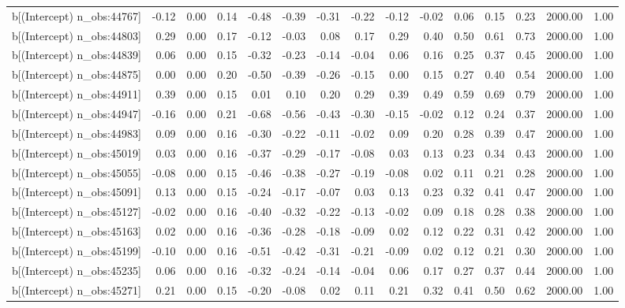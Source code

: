 \begin{table}[ht]
\begin{tabular}{rrrrrrrrrrrrrrr}
  b[(Intercept) n\_obs:44767] & -0.12 & 0.00 & 0.14 & -0.48 & -0.39 & -0.31 & -0.22 & -0.12 & -0.02 & 0.06 & 0.15 & 0.23 & 2000.00 & 1.00 \\ 
  b[(Intercept) n\_obs:44803] & 0.29 & 0.00 & 0.17 & -0.12 & -0.03 & 0.08 & 0.17 & 0.29 & 0.40 & 0.50 & 0.61 & 0.73 & 2000.00 & 1.00 \\ 
  b[(Intercept) n\_obs:44839] & 0.06 & 0.00 & 0.15 & -0.32 & -0.23 & -0.14 & -0.04 & 0.06 & 0.16 & 0.25 & 0.37 & 0.45 & 2000.00 & 1.00 \\ 
  b[(Intercept) n\_obs:44875] & 0.00 & 0.00 & 0.20 & -0.50 & -0.39 & -0.26 & -0.15 & 0.00 & 0.15 & 0.27 & 0.40 & 0.54 & 2000.00 & 1.00 \\ 
  b[(Intercept) n\_obs:44911] & 0.39 & 0.00 & 0.15 & 0.01 & 0.10 & 0.20 & 0.29 & 0.39 & 0.49 & 0.59 & 0.69 & 0.79 & 2000.00 & 1.00 \\ 
  b[(Intercept) n\_obs:44947] & -0.16 & 0.00 & 0.21 & -0.68 & -0.56 & -0.43 & -0.30 & -0.15 & -0.02 & 0.12 & 0.24 & 0.37 & 2000.00 & 1.00 \\ 
  b[(Intercept) n\_obs:44983] & 0.09 & 0.00 & 0.16 & -0.30 & -0.22 & -0.11 & -0.02 & 0.09 & 0.20 & 0.28 & 0.39 & 0.47 & 2000.00 & 1.00 \\ 
  b[(Intercept) n\_obs:45019] & 0.03 & 0.00 & 0.16 & -0.37 & -0.29 & -0.17 & -0.08 & 0.03 & 0.13 & 0.23 & 0.34 & 0.43 & 2000.00 & 1.00 \\ 
  b[(Intercept) n\_obs:45055] & -0.08 & 0.00 & 0.15 & -0.46 & -0.38 & -0.27 & -0.19 & -0.08 & 0.02 & 0.11 & 0.21 & 0.28 & 2000.00 & 1.00 \\ 
  b[(Intercept) n\_obs:45091] & 0.13 & 0.00 & 0.15 & -0.24 & -0.17 & -0.07 & 0.03 & 0.13 & 0.23 & 0.32 & 0.41 & 0.47 & 2000.00 & 1.00 \\ 
  b[(Intercept) n\_obs:45127] & -0.02 & 0.00 & 0.16 & -0.40 & -0.32 & -0.22 & -0.13 & -0.02 & 0.09 & 0.18 & 0.28 & 0.38 & 2000.00 & 1.00 \\ 
  b[(Intercept) n\_obs:45163] & 0.02 & 0.00 & 0.16 & -0.36 & -0.28 & -0.18 & -0.09 & 0.02 & 0.12 & 0.22 & 0.31 & 0.42 & 2000.00 & 1.00 \\ 
  b[(Intercept) n\_obs:45199] & -0.10 & 0.00 & 0.16 & -0.51 & -0.42 & -0.31 & -0.21 & -0.09 & 0.02 & 0.12 & 0.21 & 0.30 & 2000.00 & 1.00 \\ 
  b[(Intercept) n\_obs:45235] & 0.06 & 0.00 & 0.16 & -0.32 & -0.24 & -0.14 & -0.04 & 0.06 & 0.17 & 0.27 & 0.37 & 0.44 & 2000.00 & 1.00 \\ 
  b[(Intercept) n\_obs:45271] & 0.21 & 0.00 & 0.15 & -0.20 & -0.08 & 0.02 & 0.11 & 0.21 & 0.32 & 0.41 & 0.50 & 0.62 & 2000.00 & 1.00 \\ 

\end{tabular}
\end{table}
